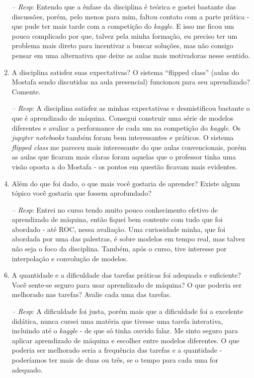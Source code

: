 \documentclass[12pt]{article}
\begin{document}
\begin{enumerate}
\begin{enumerate}
		\item[\textit{-- Resp}:] Entendo que a ênfase da disciplina é teórica e gostei bastante das discussões, porém, pelo menos para mim, faltou contato com a parte prática - que pude ter mais tarde com a competição do \textit{kaggle}. E isso me ficou um pouco complicado por que, talvez pela minha formação, eu preciso ter um problema mais direto para incentivar a buscar soluções, mas não consigo pensar em uma alternativa que deixe as aulas mais motivadoras nesse sentido.		
		\item A disciplina satisfez suas expectativas? O sistema ``flipped class'' (aulas do Mostafa sendo
		discutidas na aula presencial) funcionou para seu aprendizado? Comente.
		\item[\textit{-- Resp}:] A disciplina satisfez as minhas expectativas e desmistificou bastante o que é aprendizado de máquina. Consegui construir uma série de modelos diferentes e avaliar a performance de cada um na competição do \textit{kaggle}. Os \textit{jupyter notebooks} também foram bem interessantes e práticos. O sistema \textit{flipped class} me pareceu mais interessante do que aulas convencionais, porém as aulas que ficaram mais claras foram aquelas que o professor tinha uma visão oposta a do Mostafa - os pontos em questão ficavam mais evidentes.		
		\item Além do que foi dado, o que mais você gostaria de aprender? Existe algum tópico você gostaria que fossem aprofundado?
		\item[\textit{-- Resp}:] Entrei no curso tendo muito pouco conhecimento efetivo de aprendizado de máquina, então fiquei bem contente com tudo que foi abordado - até ROC, nessa avaliação. Uma curiosidade minha, que foi abordada por uma das palestras, é sobre modelos em tempo real, mas talvez não seja o foco da disciplina. Também, após o curso, tive interesse por interpolação e convolução de modelos.				
		\item A quantidade e a dificuldade das tarefas práticas foi adequada e suficiente? Você sente-se seguro para usar aprendizado de máquina? O que poderia ser melhorado nas tarefas? Avalie cada uma das tarefas.
		\item[\textit{-- Resp}:] A dificuldade foi justa, porém mais que a dificuldade foi a excelente didática, nunca cursei uma matéria que tivesse uma tarefa interativa, incluindo até o \textit{kaggle} - de que só tinha ouvido falar. Me sinto seguro para aplicar aprendizado de máquina e escolher entre modelos diferentes. O que poderia ser melhorado seria a frequência das tarefas e a quantidade - poderíamos ter mais de duas ou três, se o tempo para cada uma for adequado.\\

\end{enumerate}
\end{enumerate}
\end{document}
